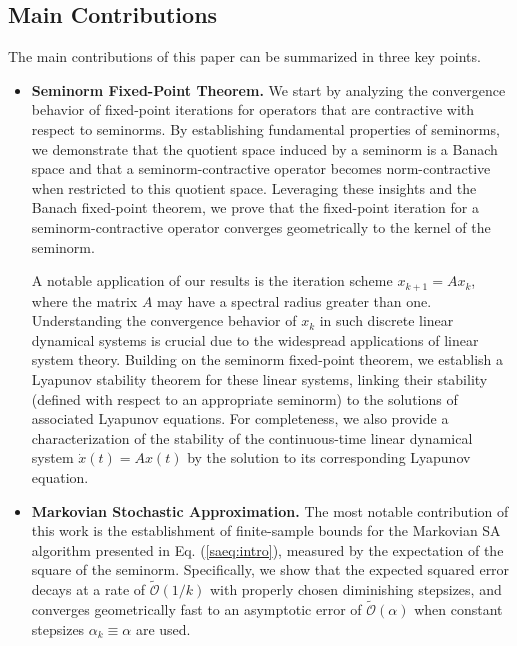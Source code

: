 \documentclass[11 pt]{article}
\begin{document}
	
	
	
	
	\subsection{Main Contributions}
	The main contributions of this paper can be summarized in three key points.
	
	\begin{itemize}
		\item \textbf{Seminorm Fixed-Point Theorem.} 
		We start by analyzing the convergence behavior of fixed-point iterations for operators that are contractive with respect to seminorms. By establishing fundamental properties of seminorms, we demonstrate that the quotient space induced by a seminorm is a Banach space and that a seminorm-contractive operator becomes norm-contractive when restricted to this quotient space. Leveraging these insights and the Banach fixed-point theorem, we prove that the fixed-point iteration for a seminorm-contractive operator converges geometrically to the kernel of the seminorm. 
		
		
		A notable application of our results is the iteration scheme $ x_{k+1} = Ax_k $, where the matrix $ A $ may have a spectral radius greater than one. Understanding the convergence behavior of $ x_k $ in such discrete linear dynamical systems is crucial due to the widespread applications of linear system theory. Building on the seminorm fixed-point theorem, we establish a Lyapunov stability theorem for these linear systems, linking their stability (defined with respect to an appropriate seminorm) to the solutions of associated Lyapunov equations. For completeness, we also provide a characterization of the stability of the continuous-time linear dynamical system $ \dot{x}(t) = Ax(t) $ by the solution to its corresponding Lyapunov equation.  
		
		
		
		\item \textbf{Markovian Stochastic Approximation.} 
		The most notable contribution of this work is the establishment of finite-sample bounds for the Markovian SA algorithm presented in Eq. (\ref{saeq:intro}), measured by the expectation of the square of the seminorm. Specifically, we show that the expected squared error decays at a rate of $\tilde{\mathcal{O}}(1/k)$ with properly chosen diminishing stepsizes, and converges geometrically fast to an asymptotic error of $\tilde{\mathcal{O}}(\alpha)$ when constant stepsizes $\alpha_k \equiv \alpha$ are used.
		

\end{itemize}
\end{document}
